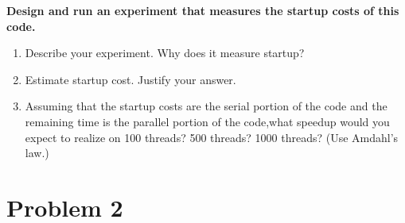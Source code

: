 \documentclass[letterpaper, 11pt]{article}
\begin{document}
\textbf{Design and run an experiment that measures the startup costs of this code.}
\begin{enumerate}
    \item Describe your experiment. Why does it measure startup?
    \item Estimate startup cost. Justify your answer.
    \item Assuming that the startup costs are the serial portion of the code and the remaining time is the parallel portion of the code,what speedup would you expect to realize on 100 threads? 500 threads? 1000 threads? (Use Amdahl's law.)
\end{enumerate}
\section*{Problem 2}
\end{document}
